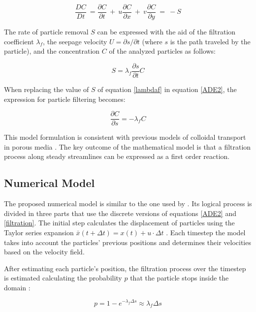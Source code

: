 \documentclass[draft,linenumbers]{agujournal2018}
\begin{document}
\begin{equation}
 \label{ADE2}
 	\frac{D C}{D t} \ = \frac{\partial C}{\partial t} \ + \ u \frac{\partial C}{\partial x} \ + \ v \frac{\partial C}{\partial y} \ = \ - S
\end{equation}

The rate of particle removal $S$ can be expressed with the aid of the filtration coefficient $\lambda_f$, the seepage velocity $U = \partial s / \partial t$ (where $s$ is the path traveled by the particle), and the concentration $C$ of the analyzed particles as follows:

\begin{equation}
 \label{lambdaf}
 	S = \lambda_f \frac{\partial s}{\partial t}C
\end{equation}

When replacing the value of $S$ of equation \ref{lambdaf} in equation  \ref{ADE2}, the expression for particle filtering becomes: 

\begin{equation}
 \label{filtration}
 	\frac{\partial C}{\partial s} = -\lambda_f C
\end{equation}

This model formulation is consistent with previous models of colloidal transport in porous media \citep{Domenico1998}. The key outcome of the mathematical model is that a filtration process along steady streamlines can be expressed as a first order reaction. 

\subsection{Numerical Model} \label{Numerical_model}

The proposed numerical model is similar to the one used by \citet{Packman2000}. Its logical process is divided in three parts that use the discrete versions of equations \ref{ADE2} and \ref{filtration}. The initial step calculates the displacement of particles using the Taylor series expansion $\bar{x}(t + \Delta t) = x(t)  + u \cdot \Delta t$ \citep{Li2017}. Each timestep the model takes into account the particles' previous positions and determines their velocities based on the velocity field. 

After estimating each particle's position, the filtration process over the timestep is estimated calculating the probability $p$ that the particle stops inside the domain \citep{Prickett1981}:

\begin{equation}
\label{Filt_disc}
	p = 1 - e^{-\lambda_f \Delta s} \approx \lambda_{f} \Delta s
\end{equation}
\end{document}
